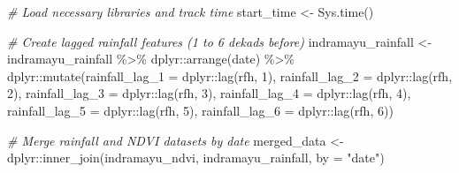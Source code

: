 \documentclass[
]{article}
\newenvironment{Shaded}{}{}
\newcommand{\AttributeTok}[1]{\textcolor[rgb]{0.49,0.56,0.16}{#1}}
\newcommand{\CommentTok}[1]{\textcolor[rgb]{0.38,0.63,0.69}{\textit{#1}}}
\newcommand{\DecValTok}[1]{\textcolor[rgb]{0.25,0.63,0.44}{#1}}
\newcommand{\FunctionTok}[1]{\textcolor[rgb]{0.02,0.16,0.49}{#1}}
\newcommand{\NormalTok}[1]{#1}
\newcommand{\OtherTok}[1]{\textcolor[rgb]{0.00,0.44,0.13}{#1}}
\newcommand{\SpecialCharTok}[1]{\textcolor[rgb]{0.25,0.44,0.63}{#1}}
\newcommand{\StringTok}[1]{\textcolor[rgb]{0.25,0.44,0.63}{#1}}
\begin{document}
\begin{Shaded}
\begin{Highlighting}[]
\CommentTok{\# Load necessary libraries and track time}
\NormalTok{start\_time }\OtherTok{\textless{}{-}} \FunctionTok{Sys.time}\NormalTok{()}

\CommentTok{\# Create lagged rainfall features (1 to 6 dekads before)}
\NormalTok{indramayu\_rainfall }\OtherTok{\textless{}{-}}\NormalTok{ indramayu\_rainfall }\SpecialCharTok{\%\textgreater{}\%}
\NormalTok{  dplyr}\SpecialCharTok{::}\FunctionTok{arrange}\NormalTok{(date) }\SpecialCharTok{\%\textgreater{}\%}
\NormalTok{  dplyr}\SpecialCharTok{::}\FunctionTok{mutate}\NormalTok{(}\AttributeTok{rainfall\_lag\_1 =}\NormalTok{ dplyr}\SpecialCharTok{::}\FunctionTok{lag}\NormalTok{(rfh, }\DecValTok{1}\NormalTok{),}
                \AttributeTok{rainfall\_lag\_2 =}\NormalTok{ dplyr}\SpecialCharTok{::}\FunctionTok{lag}\NormalTok{(rfh, }\DecValTok{2}\NormalTok{),}
                \AttributeTok{rainfall\_lag\_3 =}\NormalTok{ dplyr}\SpecialCharTok{::}\FunctionTok{lag}\NormalTok{(rfh, }\DecValTok{3}\NormalTok{),}
                \AttributeTok{rainfall\_lag\_4 =}\NormalTok{ dplyr}\SpecialCharTok{::}\FunctionTok{lag}\NormalTok{(rfh, }\DecValTok{4}\NormalTok{),}
                \AttributeTok{rainfall\_lag\_5 =}\NormalTok{ dplyr}\SpecialCharTok{::}\FunctionTok{lag}\NormalTok{(rfh, }\DecValTok{5}\NormalTok{),}
                \AttributeTok{rainfall\_lag\_6 =}\NormalTok{ dplyr}\SpecialCharTok{::}\FunctionTok{lag}\NormalTok{(rfh, }\DecValTok{6}\NormalTok{))}

\CommentTok{\# Merge rainfall and NDVI datasets by date}
\NormalTok{merged\_data }\OtherTok{\textless{}{-}}\NormalTok{ dplyr}\SpecialCharTok{::}\FunctionTok{inner\_join}\NormalTok{(indramayu\_ndvi, }
\NormalTok{                                 indramayu\_rainfall, }
                                 \AttributeTok{by =} \StringTok{"date"}\NormalTok{)}


\end{Highlighting}
\end{Shaded}
\end{document}
